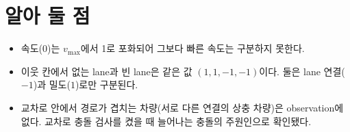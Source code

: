 \documentclass[10pt]{article}
\newcommand{\vmax}{v_{\max}}
\begin{document}
\section{알아 둘 점}
\begin{itemize}
  \item 속도(0)는 $\vmax$에서 1로 포화되어 그보다 빠른 속도는 구분하지 못한다.
  \item 이웃 칸에서 없는 lane과 빈 lane은 같은 값 $(1, 1, -1, -1)$이다. 둘은 lane 연결($-1$)과 밀도($1$)로만 구분된다.
  \item 교차로 안에서 경로가 겹치는 차량(서로 다른 연결의 상충 차량)은 observation에 없다. 교차로 충돌 검사를 켰을 때 늘어나는 충돌의 주원인으로 확인됐다.
\end{itemize}
\end{document}
